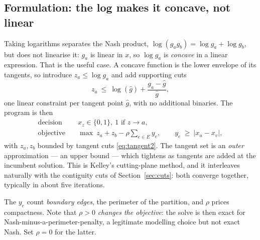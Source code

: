 \documentclass[11pt]{article}
\theoremstyle{remark}\newtheorem*{remark}{Remark}
\begin{document}
\subsection{Formulation: the log makes it concave, not linear}
Taking logarithms separates the Nash product, $\log(g_ag_b)=\log g_a+\log g_b$, but does
not linearise it: $g_a$ is linear in $x$, so $\log g_a$ is \emph{concave} in a linear
expression. That is the useful case. A concave function is the lower envelope of its
tangents, so introduce $z_a\le\log g_a$ and add supporting cuts
\begin{equation}\label{eq:tangent2}
z_a\ \le\ \log(\hat g)+\frac{g_a-\hat g}{\hat g},
\end{equation}
one linear constraint per tangent point $\hat g$, with no additional binaries. The
program is then
\begin{align}
\text{decision}\quad & x_z\in\{0,1\},\ 1 \text{ if } z\to a,\\
\text{objective}\quad & \max\ z_a+z_b-\rho\textstyle\sum_{e\in E}y_e,
\qquad y_e\ \ge\ |x_u-x_v| ,
\end{align}
with $z_a,z_b$ bounded by tangent cuts \eqref{eq:tangent2}. The tangent set is an
\emph{outer} approximation --- an upper bound --- which tightens as tangents are added
at the incumbent solution. This is Kelley's cutting-plane method, and it interleaves
naturally with the contiguity cuts of Section~\ref{sec:cuts}: both converge together,
typically in about five iterations.

The $y_e$ count \emph{boundary edges}, the perimeter of the partition, and $\rho$
prices compactness. Note that $\rho>0$ \emph{changes the objective}: the solve is then
exact for Nash-minus-a-perimeter-penalty, a legitimate modelling choice but not exact
Nash. Set $\rho=0$ for the latter.
\end{document}
